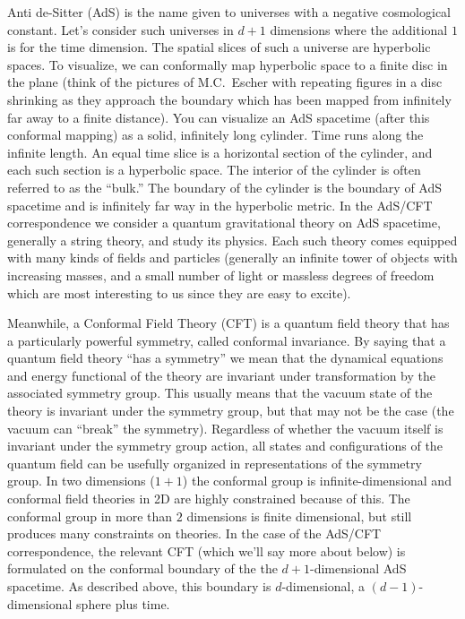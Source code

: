 \documentclass[12pt]{report}
\theoremstyle{plain}
\theoremstyle{definition}
\begin{document}
   Anti de-Sitter (AdS)  is the name given to universes with a negative cosmological constant.  Let's consider such universes in $d+1$ dimensions where the additional $1$ is for the time dimension.   The spatial slices of such a universe are hyperbolic spaces.   To visualize, we can conformally map  hyperbolic space to a finite disc in the plane (think of the pictures of M.C.\ Escher with repeating figures in a disc shrinking as they approach the boundary which has been mapped from infinitely far away to a finite distance).      You can visualize an AdS spacetime (after this conformal mapping) as a solid, infinitely long cylinder.  Time runs along the infinite length.   An equal time slice is a horizontal section of the cylinder, and each such section is a hyperbolic space.  The interior of the cylinder is often referred to as the ``bulk.''  The boundary of the cylinder is the boundary of AdS spacetime and is  infinitely far way in the hyperbolic metric.  In the AdS/CFT correspondence we consider a quantum gravitational theory on AdS spacetime, generally a string theory, and study its physics.  Each such theory comes equipped with many kinds of fields and particles (generally an infinite tower of objects with increasing masses, and a small number of light or massless degrees of freedom which are most interesting to us since they are easy to excite).

   Meanwhile, a Conformal Field Theory (CFT) is a quantum field theory that has a particularly powerful symmetry, called conformal invariance.   By saying that a quantum field theory ``has a symmetry'' we mean that the dynamical equations and energy functional of the theory are invariant under transformation by the associated symmetry group.   This usually means that the vacuum state of the theory is invariant under the symmetry group, but that may not be the case (the vacuum can ``break'' the symmetry).  Regardless of whether the vacuum itself is invariant under the symmetry group action, all states and configurations of the quantum field can be usefully organized in representations of the symmetry group.      In two dimensions ($1+1$) the conformal group is infinite-dimensional and conformal field theories in 2D are highly constrained because of this.  The conformal group in more than $2$ dimensions is finite dimensional, but still produces many constraints on theories.     In the case of the AdS/CFT correspondence, the relevant CFT (which we'll say more about below) is formulated on the conformal boundary of the the $d+1$-dimensional AdS spacetime.  As described above, this boundary is $d$-dimensional, a $(d-1)$-dimensional sphere plus time.
\end{document}
